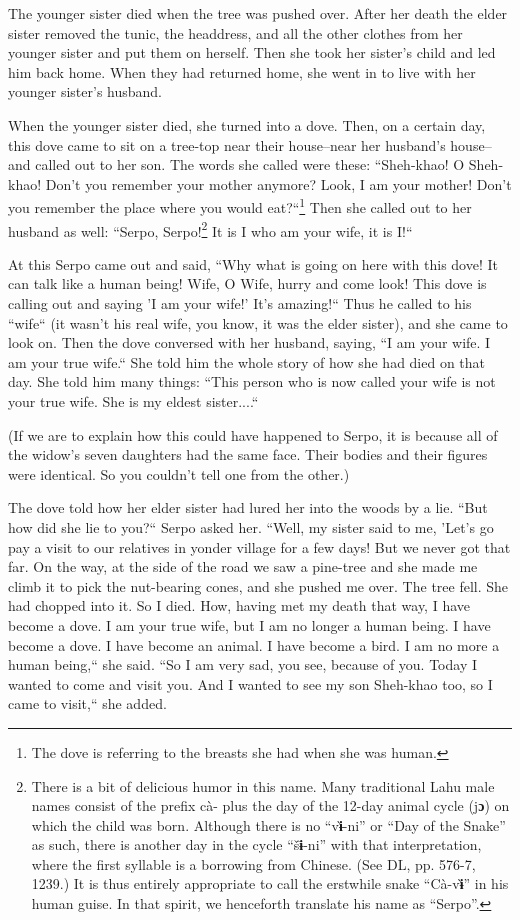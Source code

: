 The younger sister died when the tree was pushed over. After her death the elder
sister removed the tunic, the headdress, and all the other clothes from her younger
sister and put them on herself. Then she took her sister's child and led him back
home. When they had returned home, she went in to live with her younger sister's
husband.

When the younger sister died, she turned into a dove. Then, on a certain day, this
dove came to sit on a tree-top near their house--near her husband's house--and
called out to her son. The words she called were these: ``Sheh-khao! O
Sheh-khao! Don't you remember your mother anymore? Look, I am your mother! Don't
you remember the place where you would eat?``\footnote{The dove is referring to the breasts she had when she was human.} Then she called out to
her husband as well: ``Serpo, Serpo!\footnote{There is a bit of delicious humor in this name. Many traditional Lahu male names consist of the prefix cà- plus the day of the 12-day animal cycle (j\textbf{ɔ}) on which the child was born. Although there is no ``v\textbf{ɨ}̀-ni'' or ``Day of the Snake'' as such, there is another day in the cycle ``š\textbf{ɨ}̄-ni'' with that interpretation, where the first syllable is a borrowing from Chinese. (See DL, pp. 576-7, 1239.) It is thus entirely appropriate to call the erstwhile snake ``Cà-v\textbf{ɨ}̀'' in his human guise. In that spirit, we henceforth translate his name as ``Serpo''.} It is I who am your wife, it is
I!``

At this Serpo came out and said, ``Why what is going on here with this
dove! It can talk like a human being! Wife, O Wife, hurry and come look! This dove
is calling out and saying 'I am your wife!' It's amazing!`` Thus he called
to his ``wife`` (it wasn't his real wife, you know, it was the
elder sister), and she came to look on. Then the dove conversed with her husband,
saying, ``I am your wife. I am your true wife.`` She told him the
whole story of how she had died on that day. She told him many things: ``This
person who is now called your wife is not your true wife. She is my eldest sister....``

(If we are to explain how this could have happened to Serpo, it is because all
of the widow's seven daughters had the same face. Their bodies and their figures
were identical. So you couldn't tell one from the other.)

The dove told how her elder sister had lured her into the woods by a lie. ``But
how did she lie to you?`` Serpo asked her. ``Well, my sister said
to me, 'Let's go pay a visit to our relatives in yonder village for a few days!
But we never got that far. On the way, at the side of the road we saw a pine-tree
and she made me climb it to pick the nut-bearing cones, and she pushed me over.
The tree fell. She had chopped into it. So I died. How, having met my death that
way, I have become a dove. I am your true wife, but I am no longer a human being.
I have become a dove. I have become an animal. I have become a bird. I am no more
a human being,`` she said. ``So I am very sad, you see, because
of you. Today I wanted to come and visit you. And I wanted to see my son Sheh-khao
too, so I came to visit,`` she added.

